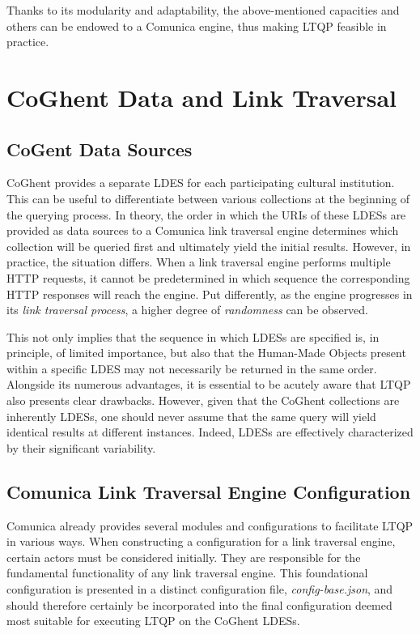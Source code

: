\documentclass[conference]{IEEEtran}
\begin{document}
Thanks to its modularity and adaptability, the above-mentioned capacities and others can be endowed to a Comunica engine, thus making LTQP feasible in practice. \cite{taelman2018comunica} \cite{taelman2019lt}

\section{CoGhent Data and Link Traversal}

\subsection{CoGent Data Sources}
CoGhent provides a separate LDES for each participating cultural institution. This can be useful to differentiate between various collections at the beginning of the querying process. In theory, the order in which the URIs of these LDESs are provided as data sources to a Comunica link traversal engine determines which collection will be queried first and ultimately yield the initial results. However, in practice, the situation differs. When a link traversal engine performs multiple HTTP requests, it cannot be predetermined in which sequence the corresponding HTTP responses will reach the engine. Put differently, as the engine progresses in its \textit{link traversal process}, a higher degree of \textit{randomness} can be observed.

This not only implies that the sequence in which LDESs are specified is, in principle, of limited importance, but also that the Human-Made Objects present within a specific LDES may not necessarily be returned in the same order. Alongside its numerous advantages, it is essential to be acutely aware that LTQP also presents clear drawbacks. However, given that the CoGhent collections are inherently LDESs, one should never assume that the same query will yield identical results at different instances. Indeed, LDESs are effectively characterized by their significant variability.

\subsection{Comunica Link Traversal Engine Configuration}
Comunica already provides several modules and configurations to facilitate LTQP in various ways. When constructing a configuration for a link traversal engine, certain actors must be considered initially. They are responsible for the fundamental functionality of any link traversal engine. This foundational configuration is presented in a distinct configuration file, \textit{config-base.json}, and should therefore certainly be incorporated into the final configuration deemed most suitable for executing LTQP on the CoGhent LDESs.
\end{document}
